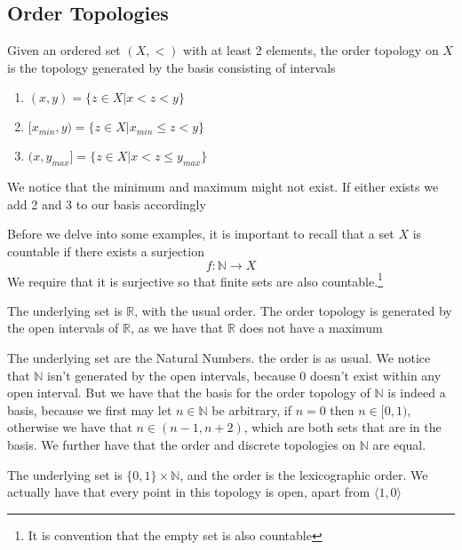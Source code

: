 \subsection{Order Topologies}
\begin{definition}
    Given an ordered set $(X,<)$ with at least 2 elements, the order topology on $X$ is the topology generated by the basis consisting of intervals
    \begin{enumerate}
        \item $(x,y) = \{z\in X\vert x<z<y\}$
        \item $[x_{min},y) = \{z\in X\vert x_{min}\leq z< y\}$
        \item $(x,y_{max}] = \{z\in X\vert x< z\leq y_{max}\}$
    \end{enumerate}
    We notice that the minimum and maximum might not exist. If either exists we add 2 and 3 to our basis accordingly
\end{definition}
Before we delve into some examples, it is important to recall that a set $X$ is countable if there exists a surjection
\[f:\mathbb{N}\to X\]
We require that it is surjective so that finite sets are also countable.\footnote{It is convention that the empty set is also countable}
\begin{example}
    The underlying set is $\mathbb{R}$, with the usual order. The order topology is generated by the open intervals of $\mathbb{R}$, as we have that $\mathbb{R}$ does not have a maximum
\end{example}
\begin{example}
    The underlying set are the Natural Numbers. the order is as usual. We notice that $\mathbb{N}$ isn't generated by the open intervals, because 0 doesn't exist within any open interval. But we have that the basis for the order topology of $\mathbb{N}$ is indeed a basis, because we first may let $n\in\mathbb{N}$ be arbitrary, if $n=0$ then $n\in[0,1)$, otherwise we have that $n\in(n-1,n+2)$, which are both sets that are in the basis. We further have that the order and discrete topologies on $\mathbb{N}$ are equal.
\end{example}
\begin{example}
    The underlying set is $\{0,1\}\times\mathbb{N}$, and the order is the lexicographic order. We actually have that every point in this topology is open, apart from $\langle1,0\rangle$
\end{example}

